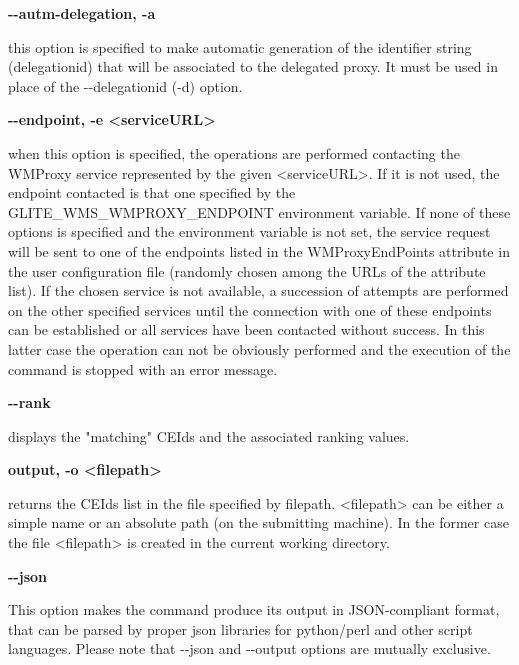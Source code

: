 \textbf{-{}-autm-delegation, -a}

this option is specified to make automatic generation of the identifier string 
(delegationid) that will be associated to the delegated proxy. It must be used 
in place of the -{}-delegationid (-d) option.





\textbf{-{}-endpoint, -e <serviceURL>}

when this option is specified, the operations are performed contacting the WMProxy 
service represented by the given <serviceURL>. If it is not used, the endpoint 
contacted is that one specified by the GLITE\_WMS\_WMPROXY\_ENDPOINT environment variable. 
If none of these options is specified and the environment variable is not set, 
the service request will be sent to one of the endpoints listed in the WMProxyEndPoints 
attribute in the user configuration file (randomly chosen among the URLs of the attribute list). 
If the chosen service is not available, a succession of attempts are performed 
on the other specified services until the connection with one of these endpoints 
can be established or all services have been contacted without success. In this latter 
case the operation can not be obviously performed and the execution of the command is 
stopped with an error message.





\textbf{-{}-rank}

displays the "matching" CEIds and the associated ranking values.





\textbf{output, -o <filepath>}

returns the CEIds list in the file specified by filepath. <filepath> can be either a 
simple name or an absolute path (on the submitting machine). 
In the former case the file <filepath> is created in the current working directory.





\textbf{-{}-json}

This option makes the command produce its output in JSON-compliant format, 
that can be parsed by proper json libraries for python/perl and other script 
languages. Please note that -{}-json and -{}-output options are mutually exclusive.





